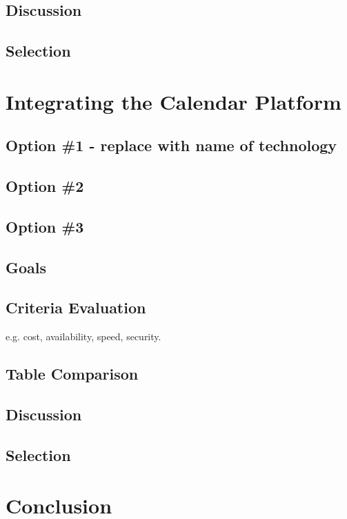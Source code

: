 \documentclass[letterpaper,10pt,draftclsnofoot,onecolumn,titlepage]{IEEEtran}
\begin{document}
	\subsection{Discussion}
	\subsection{Selection}
	
	\section{Integrating the Calendar Platform}
	\subsection{Option \#1 - replace with name of technology}
	\subsection{Option \#2}
	\subsection{Option \#3}
	\subsection{Goals}
	\subsection{Criteria Evaluation}
	e.g. cost, availability, speed, security.
	\subsection{Table Comparison}
	\subsection{Discussion}
	\subsection{Selection}
	
	\section{Conclusion}
	
	
	

	
\end{document}
